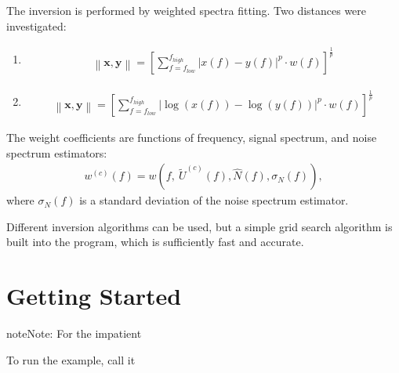 \documentclass[letterpaper,10pt,english]{sphinxmanual}
\begin{document}
\sphinxAtStartPar
The inversion is performed by weighted spectra fitting.
Two distances were investigated:
\begin{enumerate}
%
\item {} \begin{description}
\begin{equation*}
\begin{split}\left\| \textbf{x},\textbf{y} \right\|=
\left[\sum_{f=f_{low}}^{f_{high}}{\left|x\left(f\right)-y\left(f\right)\right|^p\cdot
w\left(f\right)}\right]^\frac{1}{p}\end{split}
\end{equation*}
\end{description}

\item {} \begin{description}
\begin{equation*}
\begin{split}\left\| \textbf{x},\textbf{y} \right\|=
\left[\sum_{f=f_{low}}^{f_{high}}{\left| \log\left( x\left(f\right) \right)-
\log\left( y\left(f\right) \right)\right|^p\cdot
w\left(f\right)}\right]^\frac{1}{p}\end{split}
\end{equation*}
\end{description}

\end{enumerate}

\sphinxAtStartPar
The weight coefficients are functions of frequency, signal spectrum,
and noise spectrum estimators:
\begin{equation*}
\begin{split}w^{(c)}\left(f\right)=
w\left(f,\ {\widetilde{U}}^{(c)}\left(f\right),\hat{N}\left(f\right),\sigma_N\left(f\right)\right),\end{split}
\end{equation*}
\sphinxAtStartPar
where \(\sigma_N\left(f\right)\) is a standard deviation of the noise spectrum estimator.

\sphinxAtStartPar
Different inversion algorithms can be used,
but a simple grid search algorithm is  built into the program,
which is sufficiently fast and accurate.

\sphinxstepscope


\chapter{Getting Started}
\label{\detokenize{getting_started:getting-started}}\label{\detokenize{getting_started:id1}}\label{\detokenize{getting_started::doc}}
\begin{sphinxadmonition}{note}{Note:}
\sphinxAtStartPar
For the impatient

\sphinxAtStartPar
To run the example, call it 
\end{sphinxadmonition}
\end{document}
